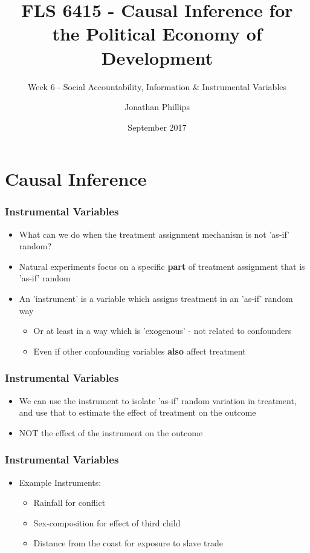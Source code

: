 \documentclass[xcolor=x11names,compress]{beamer}\usepackage[]{graphicx}\usepackage[]{color}
\title{FLS 6415 - Causal Inference for the Political Economy of Development}
\subtitle{Week 6 - Social Accountability, Information \& Instrumental Variables}
\author{Jonathan Phillips}
\date{September  2017}
\renewcommand{\(}{\begin{columns}}
\renewcommand{\)}{\end{columns}}
\newcommand{\<}[1]{\begin{column}{#1}}
\renewcommand{\>}{\end{column}}
\begin{document}
\frame{\titlepage}

\section{Causal Inference}

\begin{frame}
\frametitle{Instrumental Variables}
\begin{itemize}
\item What can we do when the treatment assignment mechanism is not 'as-if' random?
\pause
\item Natural experiments focus on a specific \textbf{part} of treatment assignment that is 'as-if' random
\pause
\item An 'instrument' is a variable which assigns treatment in an 'as-if' random way
\pause
\begin{itemize}
\item Or at least in a way which is 'exogenous' - not related to confounders
\item Even if other confounding variables \textbf{also} affect treatment
\end{itemize}
\end{itemize}
\end{frame}

\begin{frame}
\frametitle{Instrumental Variables}
\begin{itemize}
\item We can use the instrument to isolate 'as-if' random variation in treatment, and use that to estimate the effect of treatment on the outcome
\pause
\item NOT the effect of the instrument on the outcome
\end{itemize}
\end{frame}

\begin{frame}
\frametitle{Instrumental Variables}
\begin{itemize}
\item Example Instruments:
\begin{itemize}
\item Rainfall for conflict 
\item Sex-composition for effect of third child
\item Distance from the coast for exposure to slave trade
\end{itemize}
\end{itemize}
\end{frame}
\end{document}
